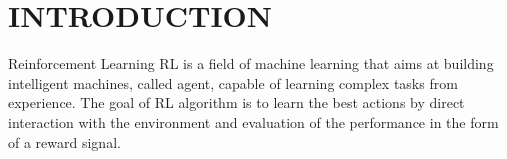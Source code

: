 \chapter{INTRODUCTION} \label{chap:aChapter}

Reinforcement Learning \ac{RL} is a field of machine learning that aims at building intelligent machines, called agent, capable of learning complex tasks from experience.
The goal of \acs{RL} \cite{sutton1998reinforcement} algorithm is to learn the best actions by direct interaction with the environment and evaluation of the performance in the form of a reward signal.


